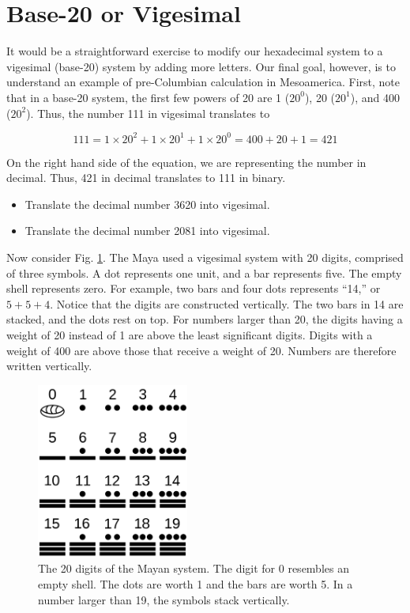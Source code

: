 \documentclass[12pt]{article}
\begin{document}
\section{Base-20 or Vigesimal}

It would be a straightforward exercise to modify our hexadecimal system to a vigesimal (base-20) system by adding more letters.  Our final goal, however, is to understand an example of pre-Columbian calculation in Mesoamerica.  First, note that in a base-20 system, the first few powers of 20 are 1 ($20^0$), 20 ($20^1$), and 400 ($20^2$). Thus, the number 111 in vigesimal translates to

\begin{equation}
111 = 1 \times 20^2 + 1\times 20^1 + 1\times 20^0 = 400 + 20 + 1 = 421
\end{equation}

On the right hand side of the equation, we are representing the number in decimal.  Thus, 421 in decimal translates to 111 in binary.

\begin{itemize}
\item Translate the decimal number 3620 into vigesimal. \\ \vspace{1cm}
\item Translate the decimal number 2081 into vigesimal. \\ \vspace{1cm}
\end{itemize}

\clearpage

Now consider Fig. \ref{fig:maya}.  The Maya used a vigesimal system with 20 digits, comprised of three symbols.  A dot represents one unit, and a bar represents five.  The empty shell represents zero.  For example, two bars and four dots represents ``14,'' or $5 + 5 + 4$.  Notice that the digits are constructed vertically.  The two bars in 14 are stacked, and the dots rest on top.  For numbers larger than 20, the digits having a weight of 20 instead of 1 are above the least significant digits.  Digits with a weight of 400 are above those that receive a weight of 20.  Numbers are therefore written vertically.

\begin{figure}
\centering
\includegraphics[width=5cm]{figures/maya_digits.png}
\caption{\label{fig:maya} The 20 digits of the Mayan system.  The digit for 0 resembles an empty shell.  The dots are worth 1 and the bars are worth 5.  In a number larger than 19, the symbols stack vertically.}
\end{figure}
\end{document}
